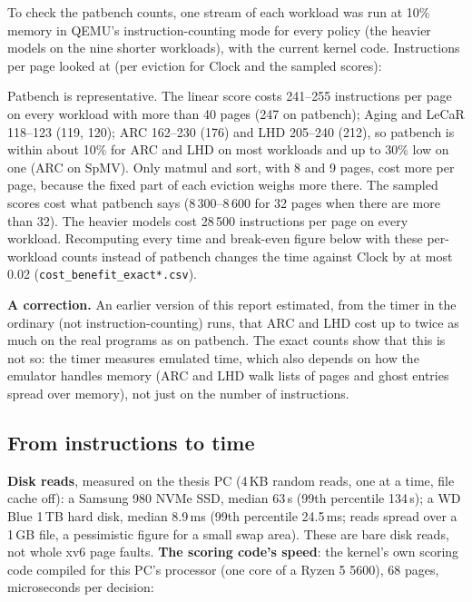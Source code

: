 \documentclass[10.5pt,a4paper]{article}
\newcommand{\code}[1]{\texttt{#1}}
\begin{document}
To check the patbench counts, one stream of each workload was run at 10\% memory in QEMU's instruction-counting mode for every policy (the heavier models on the nine shorter workloads), with the current kernel code. Instructions per page looked at (per eviction for Clock and the sampled scores):

\begin{table}[h]
\centering\small
\resizebox{\linewidth}{!}{}
\caption{Exact instructions per page looked at (Aging to the linear score) and per eviction (Clock and the sampled scores), one stream per workload (\code{kernel\_eval\_icount.csv}). First row: patbench at 68 pages.}
\end{table}

Patbench is representative. The linear score costs 241--255 instructions per page on every workload with more than 40 pages (247 on patbench); Aging and LeCaR 118--123 (119, 120); ARC 162--230 (176) and LHD 205--240 (212), so patbench is within about 10\% for ARC and LHD on most workloads and up to 30\% low on one (ARC on SpMV). Only matmul and sort, with 8 and 9 pages, cost more per page, because the fixed part of each eviction weighs more there. The sampled scores cost what patbench says (8\,300--8\,600 for 32 pages when there are more than 32). The heavier models cost 28\,500 instructions per page on every workload. Recomputing every time and break-even figure below with these per-workload counts instead of patbench changes the time against Clock by at most 0.02 (\code{cost\_benefit\_exact*.csv}).

\textbf{A correction.} An earlier version of this report estimated, from the timer in the ordinary (not instruction-counting) runs, that ARC and LHD cost up to twice as much on the real programs as on patbench. The exact counts show that this is not so: the timer measures emulated time, which also depends on how the emulator handles memory (ARC and LHD walk lists of pages and ghost entries spread over memory), not just on the number of instructions.

\subsection{From instructions to time}

\textbf{Disk reads}, measured on the thesis PC (4\,KB random reads, one at a time, file cache off): a Samsung 980 NVMe SSD, median 63\,\textmu s (99th percentile 134\,\textmu s); a WD Blue 1\,TB hard disk, median 8.9\,ms
(99th percentile 24.5\,ms; reads spread over a 1\,GB file, a pessimistic figure for a small swap area). These are bare disk reads, not whole xv6 page faults.
\textbf{The scoring code's speed}: the kernel's own scoring code compiled for this PC's processor (one core of a Ryzen 5 5600), 68 pages, microseconds per decision:
\end{document}
